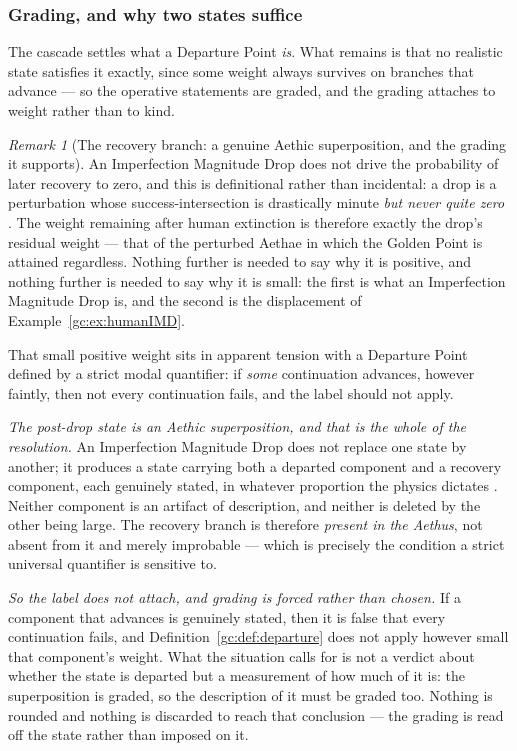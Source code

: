 \documentclass[11pt]{article}
\numberwithin{equation}{section}
\theoremstyle{plain}
\theoremstyle{definition}
\theoremstyle{remark}
\newtheorem{remark}[theorem]{Remark}
\begin{document}
\subsubsection{Grading, and why two states suffice}
\label{gc:subsub:grading}

The cascade settles what a Departure Point \emph{is}. What remains is
that no realistic state satisfies it exactly, since some weight always
survives on branches that advance --- so the operative statements are
graded, and the grading attaches to weight rather than to kind.

\begin{remark}[The recovery branch: a genuine Aethic superposition,
and the grading it supports]\label{gc:rem:boltzmann}
An Imperfection Magnitude Drop does not drive the probability of later
recovery to zero, and this is definitional rather than incidental: a
drop is a perturbation whose success-intersection is drastically minute
\emph{but never quite zero} \cite{Nexus}. The weight remaining after
human extinction is therefore exactly the drop's residual weight ---
that of the perturbed Aethae in which the Golden Point is attained
regardless. Nothing further is needed to say why it is positive, and
nothing further is needed to say why it is small: the first is what an
Imperfection Magnitude Drop is, and the second is the displacement of
Example~\ref{gc:ex:humanIMD}.

That small positive weight sits in apparent tension with a Departure
Point defined by a strict modal quantifier: if \emph{some} continuation
advances, however faintly, then not every continuation fails, and the
label should not apply.

\emph{The post-drop state is an Aethic superposition, and that is the
whole of the resolution.} An Imperfection Magnitude Drop does not
replace one state by another; it produces a state carrying both a
departed component and a recovery component, each genuinely stated, in
whatever proportion the physics dictates \cite{WeightAlg}. Neither
component is an artifact of description, and neither is deleted by the
other being large. The recovery branch is therefore \emph{present in
the Aethus}, not absent from it and merely improbable --- which is
precisely the condition a strict universal quantifier is sensitive to.

\emph{So the label does not attach, and grading is forced rather than
chosen.} If a component that advances is genuinely stated, then it is
false that every continuation fails, and
Definition~\ref{gc:def:departure} does not apply however small that
component's weight. What the situation calls for is not a verdict about
whether the state is departed but a measurement of how much of it is:
the superposition is graded, so the description of it must be graded
too. Nothing is rounded and nothing is discarded to reach that
conclusion --- the grading is read off the state rather than imposed on
it.


\end{remark}
\end{document}

